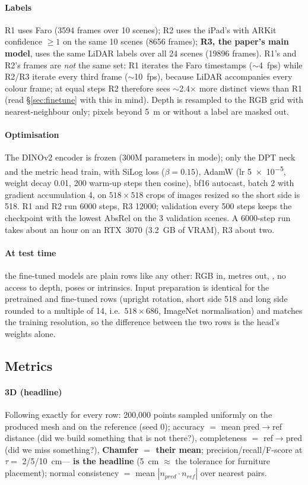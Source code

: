 \paragraph{Labels} R1 uses Faro  (\num{3594} frames over 10 scenes); R2 uses the iPad's
 with ARKit confidence $\geq 1$ on the same 10 scenes (\num{8656} frames); \textbf{R3, the paper's
main model}, uses the same LiDAR labels over all 24 scenes (\num{19896} frames). R1's and R2's frames are \emph{not} the
same set: R1 iterates the Faro timestamps ($\sim$4~fps) while R2/R3 iterate every third  frame
($\sim$10~fps), because LiDAR accompanies every colour frame; at equal steps R2 therefore sees $\sim$2.4$\times$ more
distinct views than R1 (read \S\ref{sec:finetune} with this in mind). Depth is
resampled to the RGB grid with nearest-neighbour only; pixels beyond \SI{5}{m} or without a label are masked out.
\paragraph{Optimisation} The DINOv2 encoder is frozen (\num{300}M parameters in  mode); only the DPT neck
and the metric head train, with SiLog loss ($\beta = 0.15$), AdamW (lr \num{5e-5}, weight decay 0.01, 200 warm-up steps
then cosine), bf16 autocast, batch 2 with gradient accumulation 4, on $518\times518$ crops of images resized so the
short side is 518. R1 and R2 run \num{6000} steps, R3 \num{12000}; validation every 500 steps keeps the checkpoint with
the lowest AbsRel on the 3 validation scenes. A \num{6000}-step run takes about an hour on an RTX~3070 (\SI{3.2}{GB} of VRAM), R3 about two.
\paragraph{At test time} the fine-tuned models are plain  rows like any other: RGB in, metres out,
, no access to depth, poses or intrinsics. Input preparation is identical for the pretrained and
fine-tuned rows (upright rotation, short side 518 and long side rounded to a multiple of 14, i.e.\ $518\times686$,
ImageNet normalisation) and matches the training resolution, so the difference between the two rows is the head's
weights alone.

\subsection{Metrics}\label{sec:metrics}
\paragraph{3D (headline)} Following  exactly for every row: 200{,}000 points sampled uniformly on
the produced mesh and on the reference (seed 0); accuracy $=$ mean pred$\rightarrow$ref distance (did we build
something that is not there?), completeness $=$ ref$\rightarrow$pred (did we miss something?), \textbf{Chamfer $=$
their mean}; precision/recall/F-score at $\tau = $ \SI{2}{}/\SI{5}{}/\SI{10}{cm}---\textbf{\fscore{} is the headline}
(\SI{5}{cm} $\approx$ the tolerance for furniture placement); normal consistency $=$ mean $|n_{pred}\cdot n_{ref}|$ over
nearest pairs.

